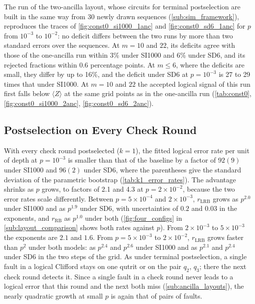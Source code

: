 The run of the two-ancilla layout, whose circuits for terminal postselection are built in the same way from 30 newly drawn sequences (\autoref{sub:sim_framework}), reproduces the traces of \autoref{fig:const0_si1000_1anc} and \autoref{fig:const0_sd6_1anc} for $p$ from $10^{-3}$ to $10^{-2}$: no deficit differs between the two runs by more than two standard errors over the sequences. At $m = 10$ and $22$, its deficits agree with those of the one-ancilla run within 3\% under SI1000 and 6\% under SD6, and its rejected fractions within $0.6$ percentage points. At $m \le 6$, where the deficits are small, they differ by up to 16\%, and the deficit under SD6 at $p = 10^{-3}$ is 27 to 29 times that under SI1000. At $m = 10$ and $22$ the accepted logical signal of this run first falls below $\langle Z \rangle$ at the same grid points as in the one-ancilla run (\autoref{tab:const0}, \autoref{fig:const0_si1000_2anc}, \autoref{fig:const0_sd6_2anc}).

\subsection{Postselection on Every Check Round}
\label{sub:interval_results}

With every check round postselected ($k = 1$), the fitted logical error rate per unit of depth at $p = 10^{-3}$ is smaller than that of the baseline by a factor of $92(9)$ under SI1000 and $96(2)$ under SD6, where the parentheses give the standard deviation of the parametric bootstrap (\autoref{tab:k1_error_rates}). The advantage shrinks as $p$ grows, to factors of 2.1 and 4.3 at $p = 2\times10^{-2}$, because the two error rates scale differently. Between $p = 5\times10^{-4}$ and $2\times10^{-3}$, $r_{\mathrm{LRB}}$ grows as $p^{2.0}$ under SI1000 and as $p^{1.9}$ under SD6, with uncertainties of $0.2$ and $0.03$ in the exponents, and $r_{\mathrm{RB}}$ as $p^{1.0}$ under both (\autoref{fig:four_configs} in \autoref{sub:layout_comparison} shows both rates against $p$). From $2\times10^{-3}$ to $5\times10^{-3}$ the exponents are $2.1$ and $1.6$. From $p = 5\times10^{-3}$ to $2\times10^{-2}$, $r_{\mathrm{LRB}}$ grows faster than $p^2$ under both models: as $p^{2.4}$ and $p^{2.6}$ under SI1000 and as $p^{2.1}$ and $p^{2.4}$ under SD6 in the two steps of the grid. As under terminal postselection, a single fault in a logical Clifford stays on one qutrit or on the pair $q_2$, $q_3$; there the next check round detects it. Since a single fault in a check round never leads to a logical error that this round and the next both miss (\autoref{sub:ancilla_layouts}), the nearly quadratic growth at small $p$ is again that of pairs of faults.

